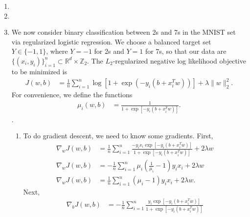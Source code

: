 \documentclass[11pt,letterpaper]{article}
\numberwithin{equation}{section}
\numberwithin{figure}{section}
\begin{document}
\begin{enumerate}
	\item 












	\item



















	\item We now consider binary classification between 2s and 7s in the MNIST set via regularized logistic regression. We choose a balanced target set $Y \in \{-1,1\}$, where $Y=-1$ for 2s and $Y = 1$ for 7s, so that our data are $\{(x_i,y_i)\}_{i=1}^n \subset \mathbb{R}^d \times \mathbb{Z}_2$. The $L_2$-regularized negative log likelihood objective to be minimized is
	\begin{align*}
		J(w,b) &= \frac{1}{n} \sum_{i=1}^n \log\left[1 + \exp\left(-y_i(b+x_i^T w)\right)\right] + \lambda \|w\|_2^2.
	\end{align*}
	For convenience, we define the functions
	\begin{align*}
		\mu_i(w,b) &= \frac{1}{1+\exp\left[-y_i(b+x_i^T w)\right]}.
	\end{align*}.
	\begin{enumerate}
		\item To do gradient descent, we need to know some gradients. First,
		\begin{align*}
			\nabla_w J(w,b) &= \frac{1}{n} \sum_{i=1}^n \frac{-y_i x_i \exp\left[-y_i(b + x_i^T w)\right]}{1 + \exp\left[-y_i(b+x_i^T w)\right]} + 2\lambda w\\
			\nabla_w J(w,b) &= -\frac{1}{n} \sum_{i=1}^n \mu_i \left(\frac{1}{\mu_i} - 1\right) y_i x_i + 2\lambda w\\
			\nabla_w J(w,b) &= \frac{1}{n} \sum_{i=1}^n (\mu_i - 1) y_i x_i + 2\lambda w.
		\end{align*}
		Next,
		\begin{align*}
			\nabla_b J(w,b) &= -\frac{1}{n} \sum_{i=1}^n \frac{y_i \exp\left[-y_i(b + x_i^T w)\right]}{1+\exp\left[-y_i(b+x_i^T w)\right]}\\

\end{align*}
\end{enumerate}
\end{enumerate}
\end{document}
